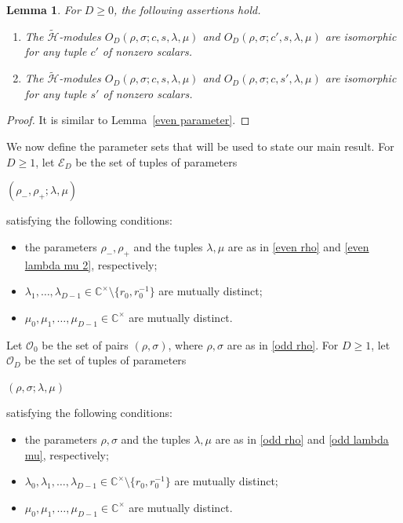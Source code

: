 \documentclass[reqno]{amsart}
\newtheorem{lemma}[theorem]{Lemma}
\theoremstyle{definition}
\begin{document}
\begin{lemma}\label{odd parameter}
%
For $D\geq 0$, the following assertions hold.
\begin{enumerate}
\item[\rm(i)]
The $\widetilde{\mathcal{H}}$-modules
$O_D(\rho,\sigma;c,s,\lambda,\mu)$ and
$O_D(\rho,\sigma;c',s,\lambda,\mu)$
are isomorphic for any tuple $c'$ of nonzero scalars.
\item[\rm(ii)]
The $\widetilde{\mathcal{H}}$-modules
$O_D(\rho,\sigma;c,s,\lambda,\mu)$ and
$O_D(\rho,\sigma;c,s',\lambda,\mu)$
are isomorphic for any tuple $s'$ of nonzero scalars.
\end{enumerate}
%
\end{lemma}

\begin{proof}
It is similar to Lemma~\ref{even parameter}.
\end{proof}

We now define the parameter sets that will be used to state our main result.
For $D\geq 1$, let $\mathcal{E}_D$ be the set of tuples of parameters
\begin{center}
$(\rho_-,\rho_+;\lambda,\mu)$
\end{center}
satisfying the following conditions:
\begin{itemize}
\item the parameters $\rho_-,\rho_+$ and the tuples $\lambda,\mu$
are as in \eqref{even rho} and \eqref{even lambda mu 2}, respectively;
\item $\lambda_1,\dots,\lambda_{D-1}
\in \mathbb{C}^{\times}\setminus\{r_0,r_0^{-1}\}$
are mutually distinct; 
\item $\mu_0,\mu_1,\dots,\mu_{D-1}\in\mathbb{C}^{\times}$
are mutually distinct.
\end{itemize}

Let $\mathcal{O}_0$ be the set of pairs $(\rho,\sigma)$,
where $\rho,\sigma$ are as in \eqref{odd rho}.
For $D\geq 1$, let $\mathcal{O}_D$ be the set of tuples of parameters
\begin{center}
$(\rho,\sigma;\lambda,\mu)$
\end{center}
satisfying the following conditions:
\begin{itemize}
\item the parameters $\rho,\sigma$ and the tuples $\lambda,\mu$
are as in \eqref{odd rho} and \eqref{odd lambda mu}, respectively;
\item $\lambda_0,\lambda_1,\dots,\lambda_{D-1}
\in \mathbb{C}^{\times}\setminus\{r_0,r_0^{-1}\}$
are mutually distinct; 
\item $\mu_0,\mu_1,\dots,\mu_{D-1}\in\mathbb{C}^{\times}$
are mutually distinct.
\end{itemize}
\end{document}
